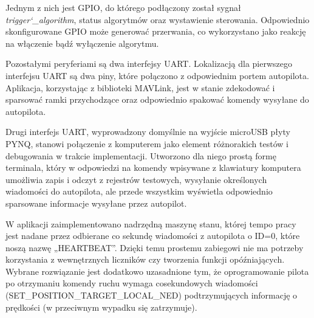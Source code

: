 Jednym z nich jest GPIO, do którego podłączony został sygnał \textit{trigger\char`_algorithm}, status algorytmów oraz wystawienie sterowania. %
Odpowiednio skonfigurowane GPIO może generować przerwania, co wykorzystano jako reakcję na włączenie bądź wyłączenie algorytmu.

Pozostałymi peryferiami są dwa interfejsy UART. 
Lokalizacją dla pierwszego interfejsu UART są dwa piny, które połączono z odpowiednim portem autopilota. 
Aplikacja, korzystając z biblioteki MAVLink, jest w stanie zdekodować i sparsować ramki przychodzące oraz odpowiednio spakować komendy wysyłane do autopilota.

Drugi interfejs UART, wyprowadzony domyślnie na wyjście microUSB płyty PYNQ, stanowi połączenie z komputerem jako element różnorakich testów i debugowania w trakcie implementacji. 
Utworzono dla niego prostą formę terminala, który w odpowiedzi na komendy wpisywane z klawiatury komputera umożliwia zapis i odczyt z rejestrów testowych, wysyłanie określonych wiadomości do autopilota, ale przede wszystkim wyświetla odpowiednio sparsowane informacje wysyłane przez autopilot.

W aplikacji zaimplementowano nadrzędną maszynę stanu, której tempo pracy jest nadane przez odbierane co sekundę wiadomości z autopilota o ID=0, które noszą nazwę „HEARTBEAT”. %
Dzięki temu prostemu zabiegowi nie ma potrzeby korzystania z wewnętrznych liczników czy tworzenia funkcji opóźniających. %
Wybrane rozwiązanie jest dodatkowo uzasadnione tym, że oprogramowanie pilota po otrzymaniu komendy ruchu wymaga cosekundowych wiadomości (SET\_POSITION\_TARGET\_LOCAL\_NED) podtrzymujących informację o prędkości (w przeciwnym wypadku się zatrzymuje). 

